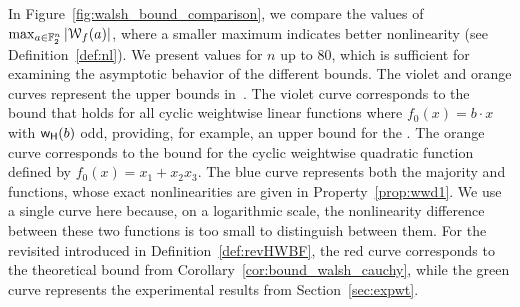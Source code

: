 \documentclass[11pt]{llncs}
\begin{document}

In Figure~\ref{fig:walsh_bound_comparison}, we compare the values of $\max_{a \in \mathbb{F}_2^n} |\mathcal W_{f}(a)|$, where a smaller maximum indicates better nonlinearity (see Definition~\ref{def:nl}). 
We present values for $n$ up to $80$, which is sufficient for examining the asymptotic behavior of the different bounds.
The violet and orange curves represent the upper bounds  in~\cite{DAM:MeaOza24}. The violet curve corresponds to the bound that holds for all cyclic weightwise linear functions where $ f_0(x) = b \cdot x $ with $\mathsf{w_H}(b)$ odd, providing, for example, an upper bound for the \hwbf{}. The orange curve corresponds to the bound for the cyclic weightwise quadratic function defined by $f_0(x) = x_1 + x_2 x_3$.
The blue curve represents both the majority and \hwbf{} functions, whose exact nonlinearities are given in Property~\ref{prop:wwd1}. We use a single curve here because, on a logarithmic scale, the nonlinearity difference between these two functions is too small to distinguish between them.
For the revisited \hwbf{} introduced in Definition~\ref{def:revHWBF}, the red curve corresponds to the theoretical bound from Corollary~\ref{cor:bound_walsh_cauchy}, while the green curve represents the experimental results from Section~\ref{sec:expwt}.
\end{document}
